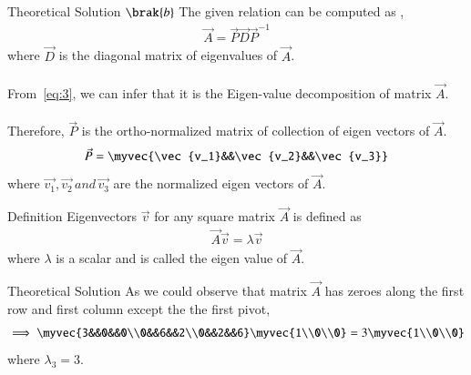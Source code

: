 \documentclass{beamer}
\begin{document}
\begin{frame}{Theoretical Solution}
$\brak{b}$ The given relation can be computed as ,
\begin{align}
    \vec{A}=\vec{P}\vec{D}\vec{P}^{-1} \label{eq:3}
\end{align}
where $\vec{D}$ is the diagonal matrix of eigenvalues of $\vec{A}$.\\
\\
From~\eqref{eq:3}, we can infer that it is the Eigen-value decomposition of matrix $\vec{A}$.\\
\\
Therefore, $\vec{P}$ is the ortho-normalized matrix of collection of eigen vectors of $\vec{A}$.
\begin{align}
    \vec{P}=\myvec{\vec{v_1}&&\vec{v_2}&&\vec{v_3}}
\end{align}
where $\vec{v_1},\vec{v_2} \,and\, \vec{v_3}$ are the normalized eigen vectors of $\vec{A}$.
\end{frame}

\begin{frame}{Definition}
Eigenvectors $\vec{v}$ for any square matrix $\vec{A}$ is defined as 
\begin{align}
    \vec{A}\vec{v}=\lambda\vec{v}
\end{align}
where $\lambda$ is a scalar and is called the eigen value of $\vec{A}$.
\end{frame}

\begin{frame}{Theoretical Solution}
As we could observe that matrix $\vec{A}$ has zeroes along the first row and first column except the the first pivot,
\begin{align}
     \implies \myvec{3&&0&&0\\0&&6&&2\\0&&2&&6}\myvec{1\\0\\0}=3\myvec{1\\0\\0}
\end{align}
where $\lambda_3=3$.\\
\end{frame}
\end{document}
